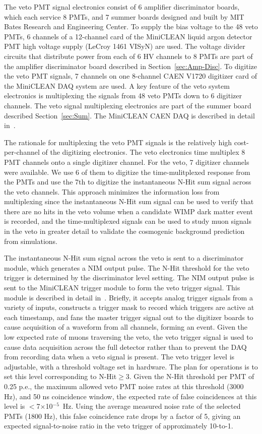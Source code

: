 \documentclass[review,number,sort&compress]{elsarticle}
\begin{document}
The veto PMT signal electronics consist of 6 amplifier discriminator
boards, which each service 8 PMTs, and 7 summer boards designed and
built by MIT Bates Research and Engineering Center.  To supply the
bias voltage to the 48 veto PMTs, 6 channels of a 12-channel card of
the MiniCLEAN liquid argon detector PMT high voltage supply (LeCroy
1461 VISyN) are used. The voltage divider circuits that distribute
power from each of 6 HV channels to 8 PMTs are part of the amplifier
discriminator board described in Section~\ref{sec:Amp-Disc}.  To
digitize the veto PMT signals, 7 channels on one 8-channel CAEN V1720
digitizer card of the MiniCLEAN DAQ system are used.  A key feature of
the veto system electronics is multiplexing the signals from 48 veto
PMTs down to 6 digitizer channels.  The veto signal multiplexing
electronics are part of the summer board described
Section~\ref{sec:Sum}. The MiniCLEAN CAEN DAQ is described in detail
in~\cite{ref:gastler_thesis}.

The rationale for multiplexing the veto PMT signals is the relatively
high cost-per-channel of the digitizing electronics.  The veto
electronics time multiplex 8 PMT channels onto a single digitizer
channel. For the veto, 7 digitizer channels were available. We use
6 of them to digitize the time-mulitplexed response from the
PMTs and use the 7th to digitize the instantaneous N-Hit sum signal
across the veto channels.  This approach minimizes the information
loss from multiplexing since the instantaneous N-Hit sum signal can be
used to verify that there are no hits in the veto volume when a
candidate WIMP dark matter event is recorded, and the time-multiplexed
signals can be used to study muon signals in the veto in greater
detail to validate the cosmogenic background prediction from simulations.

The instantaneous N-Hit sum signal across the veto is sent to a
discriminator module, which generates a NIM output pulse.  The N-Hit
threshold for the veto trigger is determined by the discriminator
level setting.  The NIM output pulse is sent to the MiniCLEAN trigger
module to form the veto trigger signal.  This module is described in
detail in~\cite{ref:gastler_thesis}.  Briefly, it accepts analog
trigger signals from a variety of inputs, constructs a trigger mask to
record which triggers are active at each timestamp, and fans the master
trigger signal out to the digitizer boards to cause acquisition of a
waveform from all channels, forming an event.  Given the low expected
rate of muons traversing the veto, the veto trigger signal is used to
cause data acquisition across the full detector rather than to prevent
the DAQ from recording data when a veto signal is present.  The veto
trigger level is adjustable, with a threshold voltage set in hardware.
The plan for operations is to set this level corresponding to
N-Hit$\ge$3.  Given the N-Hit threshold per PMT of 0.25 p.e., the
maximum allowed veto PMT noise rates at this threshold (3000 Hz), and
50 ns coincidence window, the expected rate of false coincidences at
this level is $<$7$\times$10$^{-5}$~Hz.  Using the average measured
noise rate of the selected PMTs (1800 Hz), this false coincidence rate
drops by a factor of 5, giving an expected signal-to-noise ratio in
the veto trigger of approximately 10-to-1.
\end{document}
